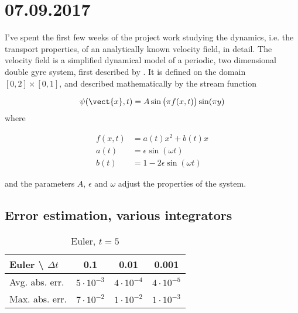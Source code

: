 \section{07.09.2017}
I've spent the first few weeks of the project work studying the
dynamics, i.e. the transport properties,  of an analytically known
velocity field, in detail. The velocity field is a simplified
dynamical model of a periodic, two dimensional double gyre system,
first described by \citet{shadden2005definition}. It is
defined on the domain $[0,2]\times[0,1]$, and described mathematically
by the stream function

\begin{equation}
  \label{eq:analytical_field_stream_function}
  \psi(\vect{x},t) = A\sin\big(\pi{}f(x,t)\big)\sin(\pi{}y)
\end{equation}
where \addtocounter{equation}{-1}

\begin{subequations}
  \begin{align}
    \label{eq:analytical_velocity_field_parameter_f}
    f(x,t) &= a(t)x^{2} + b(t)x \\
    \label{eq:analytical_velocity_field_parameter_a}
    a(t) &= \epsilon \sin(\omega{t}) \\
    \label{eq:analytical_velocity_field_parameter_b}
    b(t) &= 1 - 2\epsilon \sin(\omega{}t)
  \end{align}
\end{subequations}

and the parameters $A$, $\epsilon$ and $\omega$ adjust the properties
of the system.

\subsection{Error estimation, various integrators}

\begin{table}[h]
  \caption{Euler, $t = 5$}
  \label{tab:euler-lyapunov-error-rk4-ref}
  \centering
  \begin{tabular}[h]{l|c|c|c}
    \hline
    Euler \textbackslash\hspace{0.5em} $\Delta{t}$& 0.1 & 0.01 & 0.001 \\
    \hline
    Avg. abs. err. & $5 \cdot 10^{-3}$ & $4 \cdot 10^{-4} $ & $4 \cdot 10^{-5}$ \\
    Max. abs. err. & $7 \cdot 10^{-2}$ & $1 \cdot 10^{-2}$ & $1 \cdot 10^{-3} $ \\
    \hline
  \end{tabular}
\end{table}

